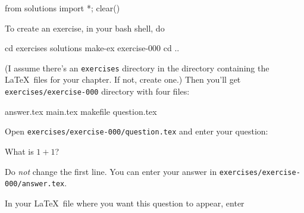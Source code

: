 \begin{python0}
from solutions import *; clear()
\end{python0}

To create an exercise, in your bash shell, do
\begin{console}
cd exercises
solutions make-ex exercise-000
cd ..
\end{console}
(I assume there's an \verb!exercises! directory in the
directory containing the \LaTeX\ files for your chapter.
If not, create one.)
Then you'll get \verb!exercises/exercise-000! directory
with four files:
\begin{console}
answer.tex  main.tex  makefile  question.tex
\end{console}

Open \verb!exercises/exercise-000/question.tex! and enter your question:
\begin{console}
What is $1 + 1$?
\end{console}
Do \textit{not} change the first line.
You can enter your answer in
\verb!exercises/exercise-000/answer.tex!.

In your \LaTeX\ file where you want this question to appear,
enter
\begin{console}

\end{console}
